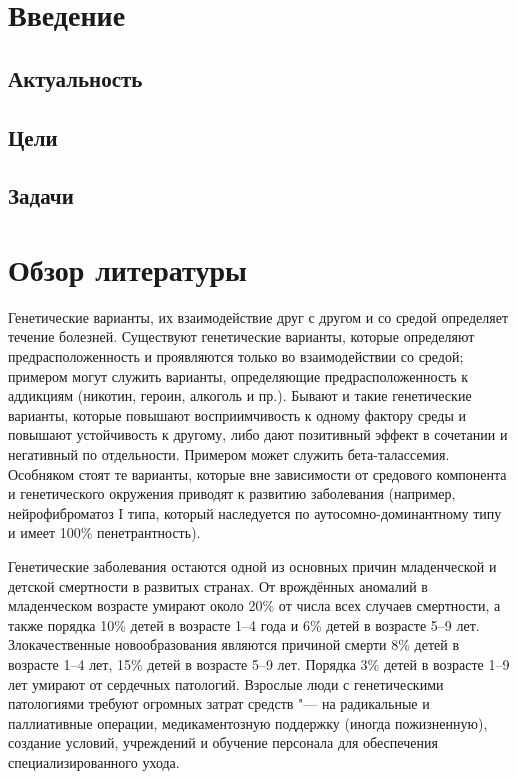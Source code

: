 \documentclass[a4paper,12pt]{article}
\begin{document}
\section{Введение}

\subsection{Актуальность}

\subsection{Цели}

\subsection{Задачи}

\section{Обзор литературы}

Генетические варианты, их взаимодействие друг с другом и со средой определяет течение болезней.
Существуют генетические варианты, которые определяют предрасположенность и проявляются только во взаимодействии со средой; примером могут служить варианты, определяющие предрасположенность к аддикциям (никотин, героин, алкоголь и пр.)\cite{hiroi}.
Бывают и такие генетические варианты, которые повышают восприимчивость к одному фактору среды и повышают устойчивость к другому, либо дают позитивный эффект в сочетании и негативный по отдельности.
Примером может служить бета-талассемия\cite{galanello}.
Особняком стоят те варианты, которые вне зависимости от средового компонента и генетического окружения приводят к развитию заболевания (например, нейрофиброматоз I типа, который наследуется по аутосомно-доминантному типу и имеет 100\% пенетрантность\cite{jett}).

Генетические заболевания остаются одной из основных причин младенческой и детской смертности в развитых странах.
От врождённых аномалий в младенческом возрасте умирают около 20\% от числа всех случаев смертности, а также порядка 10\% детей в возрасте 1--4 года и 6\% детей в возрасте 5--9 лет.
Злокачественные новообразования являются причиной смерти 8\% детей в возрасте 1--4 лет, 15\% детей в возрасте 5--9 лет.
Порядка 3\% детей в возрасте 1--9 лет умирают от сердечных патологий\cite{field}.
Взрослые люди с генетическими патологиями требуют огромных затрат средств "--- на радикальные и паллиативные операции, медикаментозную поддержку (иногда пожизненную), создание условий, учреждений и обучение персонала для обеспечения специализированного ухода.
\end{document}
